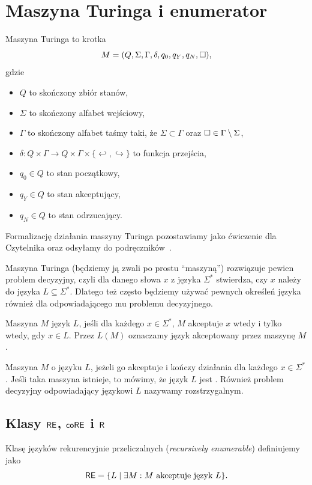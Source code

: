 \section{Maszyna Turinga i enumerator}

\begin{definition}
    Maszyna Turinga to krotka
    \[ M = (Q, \Sigma, \Gamma, \delta, q_0, q_Y, q_N, \square),\]
    gdzie
    \begin{itemize}[noitemsep]
        \item $Q$ to skończony zbiór stanów,
        \item $\Sigma$ to skończony alfabet wejściowy,
        \item $\Gamma$ to skończony alfabet taśmy taki, że $\Sigma \subset \Gamma$ oraz $\square \in \Gamma \setminus \Sigma$,
        \item $\delta : Q \times \Gamma \to Q \times \Gamma \times \{\hookleftarrow , \hookrightarrow\}$ to funkcja przejścia,
        \item $q_0 \in Q$ to stan początkowy,
        \item $q_Y \in Q$ to stan akceptujący,
        \item $q_N \in Q$ to stan odrzucający.
    \end{itemize}
    Formalizację działania maszyny Turinga pozostawiamy jako ćwiczenie dla Czytelnika oraz odsyłamy do podręczników~\cite{GareyJohnson, Sipser}.
\end{definition}

Maszyna Turinga (będziemy ją zwali po prostu \enquote{maszyną}) rozwiązuje pewien problem decyzyjny, czyli dla danego słowa $x$ z języka $\Sigma^*$ stwierdza, czy $x$ należy do języka $L \subseteq \Sigma^*$. Dlatego też często będziemy używać pewnych określeń języka również dla odpowiadającego mu problemu decyzyjnego.

Maszyna $M$  język $L$, jeśli dla każdego $x \in \Sigma^*$, $M$ akceptuje $x$ wtedy i tylko wtedy, gdy $x \in L$. Przez $L(M)$ oznaczamy język akceptowany przez maszynę $M$.

Maszyna $M$  o języku $L$, jeżeli go akceptuje i kończy działania dla każdego $x \in \Sigma^*$. Jeśli taka maszyna istnieje, to mówimy, że język $L$ jest . Również problem decyzyjny odpowiadający językowi $L$ nazywamy rozstrzygalnym.

\subsection{Klasy $\textsf{RE}$, $\textsf{coRE}$ i $\textsf{R}$}
\begin{definition}
    Klasę języków rekurencyjnie przeliczalnych (\textit{recursively enumerable}) definiujemy jako
    \[ \textsf{RE} = \{L \mid \exists M : M \text{ akceptuje język } L \}. \]
\end{definition}

